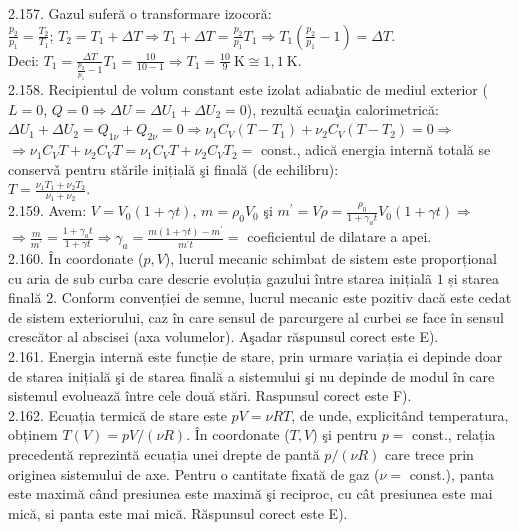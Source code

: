 2.157. Gazul suferă o transformare izocoră:\\ $\frac{p_{2}}{p_{1}}=\frac{T_{2}}{T_{1}}$; $T_{2}=T_{1}+\Delta T \Rightarrow T_{1}+\Delta T=\frac{p_{2}}{p_{1}} T_{1} \Rightarrow T_{1}\left(\frac{p_{2}}{p_{1}}-1\right)=\Delta T$.\\ Deci: $T_{1}=\frac{\Delta T}{\frac{p_{2}}{p_{1}}-1} T_{1}=\frac{10}{10-1} \Rightarrow T_{1}=\frac{10}{9} \mathrm{~K} \cong 1,1 \mathrm{~K}$.\\

2.158. Recipientul de volum constant este izolat adiabatic de mediul exterior ($L=0$, $Q=0 \Rightarrow \Delta U=\Delta U_{1}+\Delta U_{2}=0$), rezultă ecuaţia calorimetrică:\\ $\Delta U_{1}+\Delta U_{2}=Q_{1 \nu}+Q_{2 \nu}=0 \Rightarrow \nu_{1} C_{V}\left(T-T_{1}\right)+\nu_{2} C_{V}\left(T-T_{2}\right)=0 \Rightarrow$\\ $\Rightarrow \nu_{1} C_{V} T+\nu_{2} C_{V} T=\nu_{1} C_{V} T+\nu_{2} C_{V} T_{2}=$ const., adică energia internă totală se conservǎ pentru stările inițială şi finală (de echilibru):\\ $T=\frac{\nu_{1} T_{1}+\nu_{2} T_{2}}{\nu_{1}+\nu_{2}}$.\\

2.159. Avem: $V=V_{0}(1+\gamma t)$, $m=\rho_{0} V_{0}$ şi $m^{\prime}=V \rho=\frac{\rho_{0}}{1+\gamma_{a} t} V_{0}(1+\gamma t) \Rightarrow$\\ $\Rightarrow \frac{m}{m^{\prime}}=\frac{1+\gamma_{a} t}{1+\gamma t} \Rightarrow \gamma_{a}=\frac{m(1+\gamma t)-m^{\prime}}{m^{\prime} t}=$ coeficientul de dilatare a apei.\\

2.160. În coordonate ($p, V$), lucrul mecanic schimbat de sistem este proporțional cu aria de sub curba care descrie evoluția gazului între starea inițialã $1$ și starea finală $2$. Conform convenției de semne, lucrul mecanic este pozitiv dacă este cedat de sistem exteriorului, caz în care sensul de parcurgere al curbei se face în sensul crescător al abscisei (axa volumelor). Aşadar răspunsul corect este E).\\

2.161. Energia internă este funcție de stare, prin urmare variația ei depinde doar de starea inițială şi de starea finală a sistemului şi nu depinde de modul în care sistemul evoluează între cele două stări. Raspunsul corect este F).\\

2.162. Ecuația termică de stare este $p V=\nu R T$, de unde, explicitând temperatura, obținem $T(V)=p V /(\nu R)$. În coordonate ($T, V$) şi pentru $p=$ const., relația precedentă reprezintă ecuația unei drepte de pantă $p /(\nu R)$ care trece prin originea sistemului de axe. Pentru o cantitate fixată de gaz ($\nu=$ const.), panta este maximă când presiunea este maximă şi reciproc, cu cât presiunea este mai mică, si panta este mai mică. Răspunsul corect este E).\\

